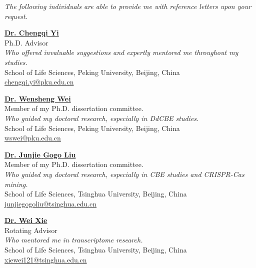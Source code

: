 \textit{The following individuals are able to provide me with reference letters upon your request.}

\vspace{4pt}

\textbf{\href{https://www.bio.pku.edu.cn/enhomes/news/teacher_dis/91.html}{Dr. Chengqi Yi}}\\
Ph.D. Advisor \\
\textit{Who offered invaluable suggestions and expertly mentored me throughout my studies.}\\
School of Life Sciences, Peking University, Beijing, China\\
\href{mailto:chengqi.yi@pku.edu.cn}{chengqi.yi@pku.edu.cn}\\

\vspace{4pt}

\textbf{\href{https://icg.pku.edu.cn/en/research/faculty/269371.htm}{Dr. Wensheng Wei}}\\
Member of my Ph.D. dissertation committee. \\
\textit{Who guided my doctoral research, especially in DdCBE studies.}\\
School of Life Sciences, Peking University, Beijing, China\\
\href{mailto:wswei@pku.edu.cn}{wswei@pku.edu.cn}\\

\vspace{4pt}

\textbf{\href{https://life.tsinghua.edu.cn/lifeen/info/1033/1341.htm}{Dr. Junjie Gogo Liu}}\\
Member of my Ph.D. dissertation committee.\\
\textit{Who guided my doctoral research, especially in CBE studies and CRISPR-Cas mining.}\\
School of Life Sciences, Tsinghua University, Beijing, China\\
\href{mailto:junjiegogoliu@tsinghua.edu.cn}{junjiegogoliu@tsinghua.edu.cn}\\

\vspace{4pt}

\textbf{\href{https://life.tsinghua.edu.cn/lifeen/info/1034/1077.htm}{Dr. Wei Xie}}\\
Rotating Advisor\\
\textit{Who mentored me in transcriptome research.}\\
School of Life Sciences, Tsinghua University, Beijing, China\\
\href{mailto:xiewei121@tsinghua.edu.cn}{xiewei121@tsinghua.edu.cn}\\


